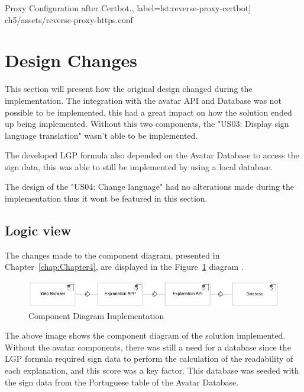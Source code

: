 \begin{center}
\begin{minipage}{0.95\linewidth}
 Proxy Configuration after Certbot.,
label=lst:reverse-proxy-certbot]
{ch5/assets/reverse-proxy-https.conf}
\end{minipage}
\end{center}

\section{Design Changes}

This section will present how the original design changed during the implementation.
The integration with the avatar API and Database was not possible to be implemented, this had a great impact on how the solution ended up being implemented.
Without this two components, the "US03: Display sign language translation" wasn't able to be implemented.

The developed \gls{LGP} formula also depended on the Avatar Database to access the sign data, this was able to still be implemented by using a local database.

The design of the "US04: Change language" had no alterations made during the implementation thus it wont be featured in this section.

\subsection{Logic view}

The changes made to the component diagram, presented in Chapter~\ref{chap:Chapter4}, are displayed in the Figure~\ref{fig:componentImp} diagram .

\begin{figure}[H]
\centering
\includegraphics[width=\textwidth,keepaspectratio]{ch5/assets/component_diagram_Implement.png}
\caption[Component Diagram Implementation]{Component Diagram Implementation}
\label{fig:componentImp}
\end{figure}

The above image shows the component diagram of the solution implemented.
Without the avatar components, there was still a need for a database since the \gls{LGP} formula required sign data to perform the calculation of the readability of each explanation, and this score was a key factor.
This database was seeded with the sign data from the Portuguese table of the Avatar Database.

